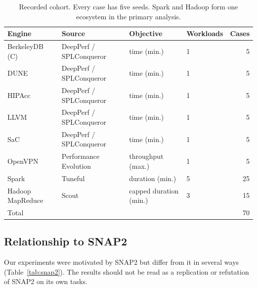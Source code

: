 \begin{table}[t]
\centering
\caption{Recorded cohort. Every case has five seeds. Spark and Hadoop form one ecosystem in the primary analysis.}
\label{tab:cohort}
\small
\begin{tabular}{llllr}
\toprule
Engine & Source & Objective & Workloads & Cases \\
\midrule
BerkeleyDB (C) & DeepPerf / SPLConqueror & time (min.) & 1 & 5 \\
DUNE & DeepPerf / SPLConqueror & time (min.) & 1 & 5 \\
HIPAcc & DeepPerf / SPLConqueror & time (min.) & 1 & 5 \\
LLVM & DeepPerf / SPLConqueror & time (min.) & 1 & 5 \\
SaC & DeepPerf / SPLConqueror & time (min.) & 1 & 5 \\
OpenVPN & Performance Evolution & throughput (max.) & 1 & 5 \\
Spark & Tuneful & duration (min.) & 5 & 25 \\
Hadoop MapReduce & Scout & capped duration (min.) & 3 & 15 \\
\midrule
Total & & & & 70 \\
\bottomrule
\end{tabular}
\end{table}

\subsection{Relationship to SNAP2}

Our experiments were motivated by SNAP2 but differ from it in several ways (Table~\ref{tab:snap2}). The results should not be read as a replication or refutation of SNAP2 on its own tasks.


